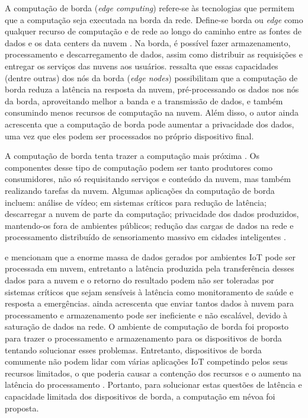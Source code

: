 
A computação de borda (\emph{edge computing}) refere-se às
tecnologias que permitem que a computação seja executada na borda da rede.
Define-se borda ou \emph{edge} como qualquer recurso de computação e de rede ao
longo do caminho entre as fontes de dados e os data centers da nuvem
\cite{Shi2016}.
Na borda, é possível fazer armazenamento, processamento e descarregamento de
dados, assim como distribuir as requisições e entregar os serviços das nuvens
aos usuários.
 ressalta que essas capacidades (dentre outras) dos nós da
borda (\emph{edge nodes}) possibilitam que a computação de borda reduza a
latência na resposta da nuvem, pré-processando os dados nos nós da borda,
aproveitando melhor a banda e a transmissão de dados, e também consumindo menos
recursos de computação na nuvem.
Além disso, o autor ainda acrescenta que a computação de borda pode aumentar a
privacidade dos dados, uma vez que eles podem ser processados no próprio
dispositivo final.

A computação de borda tenta trazer a computação mais próxima .
Os componentes desse tipo de computação podem ser
tanto produtores como consumidores, não só requisitando serviços e conteúdo da
nuvem, mas também realizando tarefas da nuvem.
Algumas aplicações da computação de borda incluem: análise de vídeo;
em sistemas críticos para redução de latência;
descarregar a nuvem de parte da computação;
privacidade dos dados produzidos, mantendo-os fora de ambientes públicos;
redução das cargas de dados na rede e
processamento distribuído de sensoriamento massivo em cidades inteligentes \cite{Shi2016}.


 e 
mencionam que a enorme massa de dados gerados por ambientes IoT pode ser
processada em nuvem, entretanto a latência produzida pela transferência desses
dados para a nuvem e o retorno do resultado podem não ser toleradas por sistemas
críticos que sejam sensíveis à latência como monitoramento de saúde e resposta a
emergências.
 ainda acrescenta que enviar tantos
dados à nuvem
para processamento e armazenamento pode ser ineficiente e não escalável, devido à
saturação de dados na rede.
O ambiente de computação de borda foi proposto para trazer o
processamento e armazenamento para os dispositivos de borda tentando solucionar
esses problemas.
Entretanto, dispositivos de borda comumente não podem lidar com várias
aplicações IoT competindo pelos seus recursos limitados, o que poderia causar a
contenção dos recursos e o aumento na latência do processamento
\cite{Dastjerdi2016}. Portanto, para solucionar estas questões de latência e
capacidade limitada dos dispositivos de borda, a computação em névoa foi proposta.

